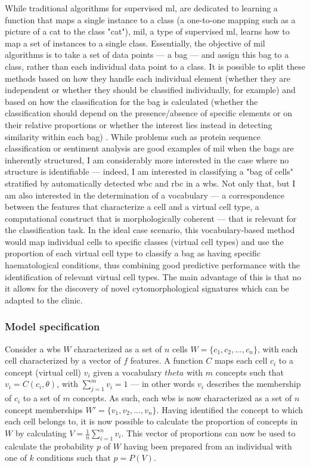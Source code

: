 While traditional algorithms for supervised \ac{ml}, are dedicated to learning a function that maps a single instance to a class (a one-to-one mapping such as a picture of a cat to the class "cat"), \ac{mil}, a type of supervised \ac{ml}, learns how to map a set of instances to a single class. Essentially, the objective of \ac{mil} algorithms is to take a set of data points --- a bag --- and assign this bag to a class, rather than each individual data point to a class. It is possible to split these methods based on how they handle each individual element (whether they are independent or whether they should be classified individually, for example) and based on how the classification for the bag is calculated (whether the classification should depend on the presence/absence of specific elements or on their relative proportions or whether the interest lies instead in detecting similarity within each bag) \cite{Amores2013-ym,Carbonneau2016-xc}. While problems such as protein sequence classification or sentiment analysis are good examples of \ac{mil} when the bags are inherently structured, I am considerably more interested in the case where no structure is identifiable --- indeed, I am interested in classifying a "bag of cells" stratified by automatically detected \ac{wbc} and \ac{rbc} in a \ac{wbs}. Not only that, but I am also interested in the determination of a vocabulary --- a correspondence between the features that characterize a cell and a virtual cell type, a computational construct that is morphologically coherent --- that is relevant for the classification task. In the ideal case scenario, this vocabulary-based method would map individual cells to specific classes (virtual cell types) and use the proportion of each virtual cell type to classify a bag as having specific haematological conditions, thus combining good predictive performance with the identification of relevant virtual cell types. The main advantage of this is that no it allows for the discovery of novel cytomorphological signatures which can be adapted to the clinic.

\subsubsection{Model specification}

Consider a \ac{wbs} $W$ characterized as a set of $n$ cells $W=\{c_1,c_2,...,c_n\}$, with each cell characterized by a vector of $f$ features. A function $C$ maps each cell $c_i$ to a concept (virtual cell) $v_i$ given a vocabulary $theta$ with $m$ concepts such that $v_i = C(c_i,\theta)$, with $\sum_{j=1}^m{v_i} = 1$ --- in other words $v_i$ describes the membership of $c_i$ to a set of $m$ concepts. As such, each \ac{wbs} is now characterized as a set of $n$ concept memberships $W'=\{v_1,v_2,...,v_n\}$. Having identified the concept to which each cell belongs to, it is now possible to calculate the proportion of concepts in $W$ by calculating $V = \frac{1}{n}\sum_{i=1}^n{v_i}$. This vector of proportions can now be used to calculate the probability $p$ of $W$ having been prepared from an individual with one of $k$ conditions such that $p = P(V)$.

